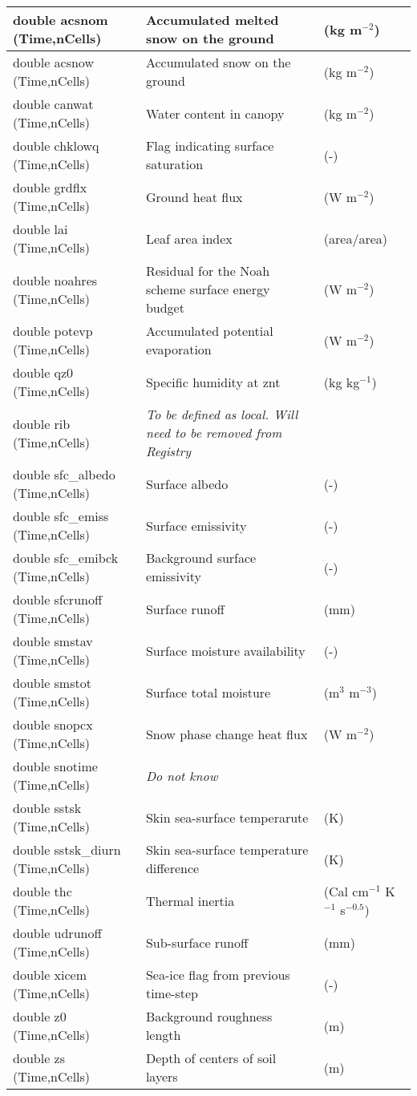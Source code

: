 {\small
\begin{longtable}{|p{2.0in} |p{3.0in} |p{1.0in} |}
\hline
double acsnom (Time,nCells) & Accumulated melted snow on the ground  & (kg m$^{-2}$) \\ \hline
double acsnow (Time,nCells) & Accumulated snow on the ground & (kg m$^{-2}$)  \\ \hline
double canwat (Time,nCells) & Water content in canopy & (kg m$^{-2}$) \\ \hline
double chklowq (Time,nCells) & Flag indicating surface saturation & (-) \\ \hline
double grdflx (Time,nCells) & Ground heat flux & (W m$^{-2}$) \\ \hline
double lai (Time,nCells) & Leaf area index & (area/area) \\ \hline
double noahres  (Time,nCells) & Residual for the Noah scheme surface energy budget & (W m$^{-2}$) \\ \hline
double potevp  (Time,nCells) & Accumulated potential evaporation & (W m$^{-2}$) \\ \hline
double qz0  (Time,nCells) & Specific humidity at znt & (kg kg$^{-1}$) \\ \hline
double rib  (Time,nCells) & \em{To be defined as local. Will need to be removed from Registry} & \\ \hline
double sfc\_albedo  (Time,nCells) & Surface albedo & (-) \\ \hline
double sfc\_emiss (Time,nCells) & Surface emissivity & (-) \\ \hline
double sfc\_emibck  (Time,nCells) & Background surface emissivity & (-) \\ \hline
double sfcrunoff (Time,nCells) & Surface runoff & (mm) \\ \hline
double smstav (Time,nCells) & Surface moisture availability & (-) \\ \hline
double smstot (Time,nCells) & Surface total moisture &  (m$^{3}$ m$^{-3}$) \\ \hline
double snopcx (Time,nCells) & Snow phase change heat flux &  (W m$^{-2}$) \\ \hline
double snotime (Time,nCells) & \em{Do not know} & \\  \hline
double sstsk (Time,nCells) & Skin sea-surface temperarute & (K) \\ \hline
double sstsk\_diurn (Time,nCells) & Skin sea-surface temperature difference & (K) \\ \hline
double thc (Time,nCells) & Thermal inertia & (Cal cm$^{-1} $ K$^{-1} $ s$^{-0.5} $) \\ \hline
double udrunoff (Time,nCells) & Sub-surface runoff & (mm) \\ \hline
double xicem (Time,nCells) & Sea-ice flag from previous time-step & (-) \\ \hline
double z0 (Time,nCells) & Background roughness length & (m) \\ \hline
double zs (Time,nCells) & Depth of centers of soil layers & (m) \\ \hline
\end{longtable}
}

